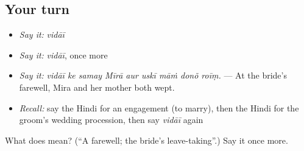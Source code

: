 \subsection*{Your turn}
\begin{itemize}
\raggedright
  \item \emph{Say it:} \emph{vidāī}
  \item \emph{Say it:} \emph{vidāī}, once more
  \item \emph{Say it:} \emph{vidāī ke samay Mīrā aur uskī māṁ donõ roīṃ.} — At the bride's farewell, Mira and her mother both wept.
  \item \emph{Recall:} say the Hindi for an engagement (to marry), then the Hindi for the groom's wedding procession, then say \emph{vidāī} again
\end{itemize}

\begin{tcolorbox}[breakable,colback=teal!4,colframe=teal!35!black,title={Before you move on}]
What does  mean? (\textquotedblleft{}A farewell; the bride's leave-taking\textquotedblright{}.) Say it once more.
\end{tcolorbox}
